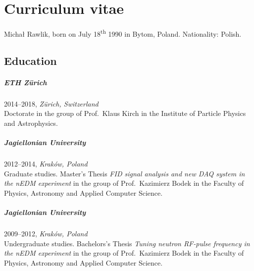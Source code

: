 



\manualmark
\markboth{\spacedlowsmallcaps{\bibname}}{\spacedlowsmallcaps{\bibname}} 


\begingroup

\let\clearpage\relax
\let\cleardoublepage\relax
\let\cleardoublepage\relax

\chapter*{Curriculum vitae} %

Michał Rawlik, born on July 18\textsuperscript{th} 1990 in Bytom, Poland. Nationality: Polish. 

\section*{Education}
\paragraph{ETH Zürich} 2014--2018, \emph{Zürich, Switzerland}\\
Doctorate in the group of Prof.\ Klaus Kirch in the Institute of Particle Physics and Astrophysics.

\paragraph{Jagiellonian University} 2012--2014, \emph{Kraków, Poland}\\
Graduate studies. Master's Thesis \emph{FID signal analysis and new DAQ system in the nEDM experiment} in the group of Prof.\ Kazimierz Bodek in the
Faculty of Physics, Astronomy and Applied Computer Science.

\paragraph{Jagiellonian University} 2009--2012, \emph{Kraków, Poland}\\
Undergraduate studies. Bachelors's Thesis \emph{Tuning neutron RF-pulse frequency in the nEDM experiment} in the group of Prof.\ Kazimierz Bodek in the
Faculty of Physics, Astronomy and Applied Computer Science.

